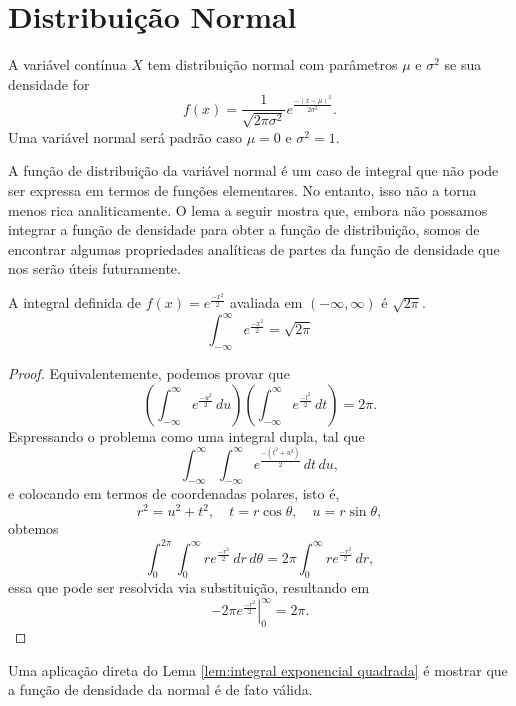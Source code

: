 \section{Distribuição Normal}

\begin{def:normal}
A variável contínua $X$ tem distribuição normal com parâmetros $\mu$ e $\sigma^2$ se
sua densidade for
\[
    f(x) = \frac{1}{\sqrt{2\pi\sigma^2}} e^{\frac{-(x - \mu)^2}{2\sigma^2}}.
\]
Uma variável normal será padrão caso $\mu = 0$ e $\sigma^2 = 1$.
\end{def:normal}

A função de distribuição da variável normal é um caso de integral que não pode ser expressa
em termos de funções elementares.
No entanto, isso não a torna menos rica analiticamente.
O lema a seguir mostra que, embora não possamos integrar a função de densidade para
obter a função de distribuição, somos de encontrar algumas propriedades analíticas de
partes da função de densidade que nos serão úteis futuramente.

\begin{lem:integral exponencial quadrada}
\label{lem:integral exponencial quadrada}
A integral definida de $f(x) = e^{\frac{-x^2}{2}}$ avaliada em $(-\infty, \infty)$ é
$\sqrt{2\pi}$.
\[
    \int_{-\infty}^\infty e^{\frac{-x^2}{2}} = \sqrt{2\pi}
\]
\end{lem:integral exponencial quadrada}
\begin{proof}
Equivalentemente, podemos provar que
\[
    \left(\int_{-\infty}^{\infty}e^{\frac{-u^2}{2}}\,du\right) \left(\int_{-\infty}^{\infty}e^{\frac{-t^2}{2}}\,dt\right) = 2\pi.
\]
Espressando o problema como uma integral dupla, tal que
\[
    \int_{-\infty}^{\infty} \int_{-\infty}^{\infty} e^{\frac{-(t^2+u^2)}{2}}\,dt\,du,
\]
e colocando em termos de coordenadas polares, isto é,
\[
    r^2 = u^2 + t^2, \quad t = r \cos \theta, \quad u = r \sin \theta,
\]
obtemos
\[
    \int_0^{2\pi} \int_0^\infty re^{\frac{-r^2}{2}}\,dr\,d \theta =
    2 \pi \int_0^\infty re^{\frac{-r^2}{2}}\,dr,
\]
essa que pode ser resolvida via substituição, resultando em
\[
    - 2 \pi \left. e^{\frac{-r^2}{2}} \right|_0^\infty = 2 \pi.
\]
\end{proof}

Uma aplicação direta do Lema \ref{lem:integral exponencial quadrada} é mostrar que a
função de densidade da normal é de fato válida.

